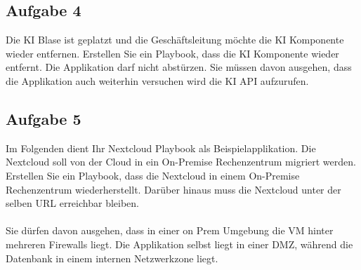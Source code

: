 \documentclass{article}
\begin{document}
    \subsection{Aufgabe 4}
    Die KI Blase ist geplatzt und die Geschäftsleitung möchte die KI Komponente wieder entfernen.
    Erstellen Sie ein Playbook, dass die KI Komponente wieder entfernt. Die Applikation darf nicht abstürzen.
    Sie müssen davon ausgehen, dass die Applikation auch weiterhin versuchen wird die KI API aufzurufen.

    \subsection{Aufgabe 5}
    Im Folgenden dient Ihr Nextcloud Playbook als Beispielapplikation.
    Die Nextcloud soll von der Cloud in ein On-Premise Rechenzentrum migriert werden.
    Erstellen Sie ein Playbook, dass die Nextcloud in einem On-Premise Rechenzentrum wiederherstellt.
    Darüber hinaus muss die Nextcloud unter der selben URL erreichbar bleiben.
    \\ \\
    Sie dürfen davon ausgehen, dass in einer on Prem Umgebung die VM hinter mehreren Firewalls liegt.
    Die Applikation selbst liegt in einer DMZ, während die Datenbank in einem internen Netzwerkzone liegt.
\end{document}
